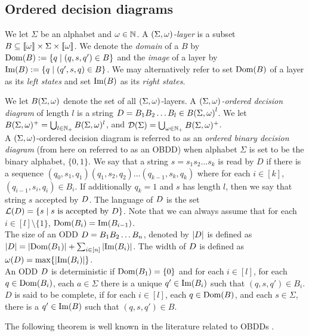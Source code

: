 \subsection{Ordered decision diagrams} 
We let $\Sigma$ be an alphabet and $\omega \in \mathbb{N}$. A  $(\Sigma, \omega)$\emph{-layer} is a subset $B \subseteq \llbracket \omega \rrbracket \times \Sigma \times \llbracket \omega \rrbracket$. We denote the \emph{domain} of a $B$ by $\mathrm{Dom}(B):= \{q \;|\; (q,s,q') \in B\}$ and the \emph{image} of a layer by $\mathrm{Im}(B):= \{q \;|\; (q',s,q) \in B\}$. We may alternatively refer to set $\mathrm{Dom}(B)$ of a layer as its \textit{left states} and set \textit{$\mathrm{Im}(B)$} as its \textit{right states}.

We let  $B(\Sigma, \omega)$ denote the set of all $(\Sigma,\omega)$-layers. A $(\Sigma,\omega)$\emph{-ordered decision diagram} of length $l$ is a string $D = B_1B_2\ldots B_l \in {B(\Sigma, \omega)}^l$. We let $B(\Sigma,\omega)^{+} = \bigcup_{l\in \mathbb{N}_+}B(\Sigma,\omega)^{l}$, and $\mathcal{D}(\Sigma) = \bigcup_{\omega\in \mathbb{N}_+} B(\Sigma,\omega)^+$. 
\\ 
A $(\Sigma,\omega)$-ordered decision diagram is referred to as an \emph{ordered binary decision diagram} (from here on referred to as an OBDD) when alphabet $\Sigma$ is set to be the binary alphabet, $\{0,1\}$. We say that a string $s=s_1 s_2 \ldots s_k$ is read by $D$ if there is a sequence $(q_0, s_1,q_1)(q_1,s_2,q_2)\ldots(q_{k-1},s_k,q_k)$ where for each $i \in [k]$, $(q_{i-1},s_i,q_i) \in B_i$. If additionally $q_k = 1$ and $s$ has length $l$, then we say that string $s$ accepted by $D$. The language of $D$ is the set $\mathcal{L}(D)= \{s\; | \; s \text{ is accepted by } D\}$. Note that we can always assume that for each $i \in [l] \setminus \{1\}$, $\mathrm{Dom}(B_i) = \mathrm{Im}(B_{i-1})$. \
\\
The size of an ODD $D = B_1B_2\dots B_n$, denoted by $|D|$ 
is defined as $|D| = |\mathrm{Dom}(B_1)|+\sum_{i\in [n]} |\mathrm{Im}(B_i)|$. The width 
of $D$ is defined as $\omega(D) = \max\{|\mathrm{Im}(B_i)|\}$. 
\\ 
An ODD $D$ is deterministic if $\mathrm{Dom}(B_1) = \{0\}$ and for each $i \in [l]$, for each $q \in \mathrm{Dom}(B_i)$, each $a \in \Sigma$ there is a unique $q'\in \mathrm{Im}(B_i)$ such that $(q,s,q') \in B_i$. $D$ is said to be complete, if for each 
$i\in [l]$, each $q\in \mathrm{Dom}(B)$, and each $s\in \Sigma$, 
there is a $q'\in \mathrm{Im}(B)$ such that $(q,s,q')\in B$.

The following theorem is well known in the literature related to OBDDs \cite{bryant1986graph}. 


